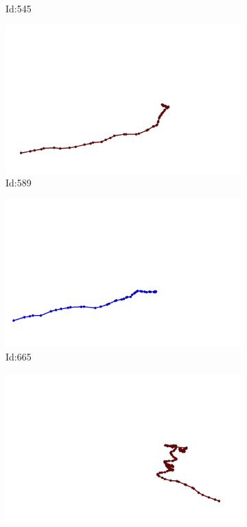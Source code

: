 \documentclass[12pt,twoside]{report}
\begin{document}
\begin{figure}
\begin{subfigure}[b]{0.20\textwidth}
\caption{Id:545}
\end{subfigure}
\begin{subfigure}[b]{0.20\textwidth}
\centering
\includegraphics[width=\textwidth]{../trajectories/589.png}
\caption{Id:589}
\end{subfigure}
\begin{subfigure}[b]{0.20\textwidth}
\centering
\includegraphics[width=\textwidth]{../trajectories/665.png}
\caption{Id:665}
\end{subfigure}
\begin{subfigure}[b]{0.20\textwidth}
\centering
\includegraphics[width=\textwidth]{../trajectories/687.png}

\end{subfigure}
\end{figure}
\end{document}
